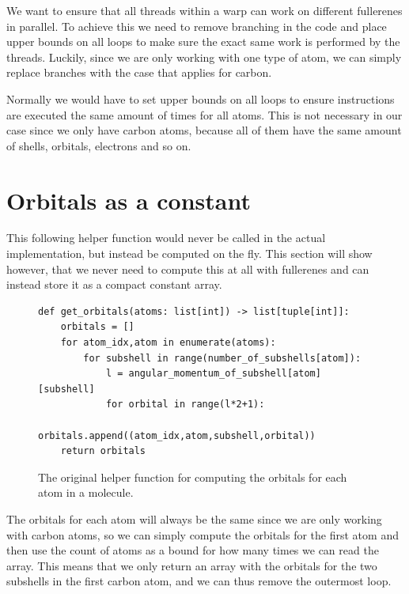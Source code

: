 We want to ensure that all threads within a warp can work on different fullerenes in parallel. To achieve this we need to remove branching in the code and place upper bounds on all loops to make sure the exact same work is performed by the threads. Luckily, since we are only working with one type of atom, we can simply replace branches with the case that applies for carbon.

Normally we would have to set upper bounds on all loops to ensure instructions are executed the same amount of times for all atoms. This is not necessary in our case since we only have carbon atoms, because all of them have the same amount of shells, orbitals, electrons and so on.

\section{Orbitals as a constant}

This following helper function would never be called in the actual implementation, but instead be computed on the fly. This section will show however, that we never need to compute this at all with fullerenes and can instead store it as a compact constant array. 

\begin{figure}[H]
\begin{verbatim}
def get_orbitals(atoms: list[int]) -> list[tuple[int]]:
    orbitals = []
    for atom_idx,atom in enumerate(atoms):
        for subshell in range(number_of_subshells[atom]):
            l = angular_momentum_of_subshell[atom][subshell] 
            for orbital in range(l*2+1):
                orbitals.append((atom_idx,atom,subshell,orbital))
    return orbitals
\end{verbatim}
\caption{The original helper function for computing the orbitals for each atom in a molecule.}
\end{figure}

The orbitals for each atom will always be the same since we are only working with carbon atoms, so we can simply compute the orbitals for the first atom and then use the count of atoms as a bound for how many times we can read the array. This means that we only return an array with the orbitals for the two subshells in the first carbon atom, and we can thus remove the outermost loop.

